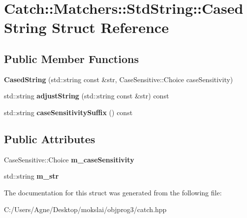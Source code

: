 \hypertarget{struct_catch_1_1_matchers_1_1_std_string_1_1_cased_string}{}\section{Catch\+:\+:Matchers\+:\+:Std\+String\+:\+:Cased\+String Struct Reference}
\label{struct_catch_1_1_matchers_1_1_std_string_1_1_cased_string}
\subsection*{Public Member Functions}
\begin{DoxyCompactItemize}
\item 
\mbox{\label{struct_catch_1_1_matchers_1_1_std_string_1_1_cased_string_aa88bbc5acd2bff22351d8d4b1816b561}} 
{\bfseries Cased\+String} (std\+::string const \&str, Case\+Sensitive\+::\+Choice case\+Sensitivity)
\item 
\mbox{\label{struct_catch_1_1_matchers_1_1_std_string_1_1_cased_string_a77639b1165c01f424ee0e96f53335010}} 
std\+::string {\bfseries adjust\+String} (std\+::string const \&str) const
\item 
\mbox{\label{struct_catch_1_1_matchers_1_1_std_string_1_1_cased_string_a9759155344d696b2476d764a1d95fcc9}} 
std\+::string {\bfseries case\+Sensitivity\+Suffix} () const
\end{DoxyCompactItemize}
\subsection*{Public Attributes}
\begin{DoxyCompactItemize}
\item 
\mbox{\label{struct_catch_1_1_matchers_1_1_std_string_1_1_cased_string_ae1c2864c986941536a6e94cca0528f92}} 
Case\+Sensitive\+::\+Choice {\bfseries m\+\_\+case\+Sensitivity}
\item 
\mbox{\label{struct_catch_1_1_matchers_1_1_std_string_1_1_cased_string_ad05dbc99aba3c3c386d6b856b213f911}} 
std\+::string {\bfseries m\+\_\+str}
\end{DoxyCompactItemize}


The documentation for this struct was generated from the following file\+:\begin{DoxyCompactItemize}
\item 
C\+:/\+Users/\+Agne/\+Desktop/mokslai/objprog3/catch.\+hpp\end{DoxyCompactItemize}
